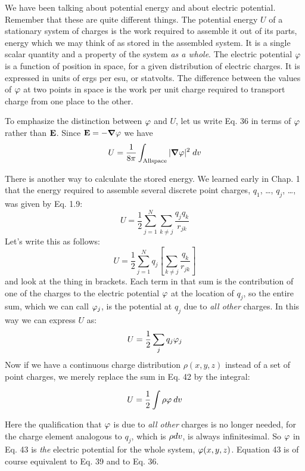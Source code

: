 We have been talking about potential energy and about electric
potential. Remember that these are quite different things. The potential
energy $U$ of a stationary system of charges is the work required
to assemble it out of its parts, energy which we may think of as stored
in the assembled system. It is a single scalar quantity and a property
of the system \emph{as a whole}. The electric potential $\varphi$ is a function of
position in space, for a given distribution of electric charges. It is
expressed in units of ergs per esu, or statvolts. The difference between
the values of $\varphi$ at two points in space is the work per unit
charge required to transport charge from one place to the other.

To emphasize the distinction between $\varphi$ and $U$, let us write Eq. 36
in terms of $\varphi$ rather than $\mathbf{E}$. Since $\mathbf{E} = -\boldsymbol{\nabla}\varphi$ we have
\begin{equation}
  U = \frac{1}{8\pi}\int_\text{All\\space} |\boldsymbol{\nabla}\varphi|^2\;d v
\end{equation}

There is another way to calculate the stored energy. We learned
early in Chap. 1 that the energy required to assemble several discrete
point charges, $q_1$, \ldots , $q_j$, \ldots , was given by Eq. 1.9:
\begin{equation}
  U = \frac{1}{2} \sum_{j=1}^N \sum_{k\ne j} \frac{q_jq_k}{r_{jk}}
\end{equation}
Let's write this as follows:
\begin{equation}
  U = \frac{1}{2} \sum_{j=1}^N q_j \left[\sum_{k\ne j} \frac{q_k}{r_{jk}}\right]
\end{equation}
and look at the thing in brackets. Each term in that sum is the contribution
of one of the charges to the electric potential $\varphi$ at the location
of $q_j$, so the entire sum, which we can call $\varphi_j$, is the potential at
$q_j$ due to \emph{all other} charges. In this way we can express $U$ as:
\begin{equation}
  U = \frac{1}{2}\sum_j q_j\varphi_j
\end{equation}
Now if we have a continuous charge distribution $\rho(x,y,z)$ instead of
a set of point charges, we merely replace the sum in Eq. 42 by the
integral:
\begin{framed}
\begin{equation}
  U = \frac{1}{2}\int \rho \varphi \:d v  
\end{equation}
\end{framed}
Here the qualification that $\varphi$ is due to \emph{all other} charges is no longer
needed, for the charge element analogous to $q_j$, which is $\rho d v$, is
always infinitesimal. So $\varphi$ in Eq. 43 is \emph{the} electric potential for the
whole system, $\varphi(x,y,z)$. Equation 43 is of course equivalent to
Eq. 39 and to Eq. 36.


